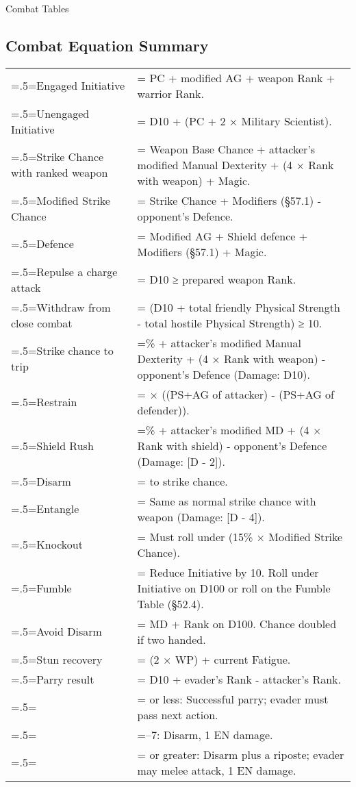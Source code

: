 \begin{Table}{Combat Tables}
\begin{multicols}{3}
\section{Combat Equation Summary}
\begin{tabularx}{\columnwidth}{>{\hsize=.5\hsize\linewidth=\hsize}X>{\hsize=1.5\hsize\linewidth=\hsize}X}
Engaged Initiative			& PC + modified AG + weapon Rank + warrior Rank. \\
Unengaged Initiative			& D10 + (PC + 2 × Military Scientist). \\
Strike Chance with ranked weapon	& Weapon Base Chance + attacker’s modified Manual Dexterity + (4 × Rank with weapon) + Magic. \\
Modified Strike Chance			& Strike Chance + Modifiers (§57.1) - opponent’s Defence. \\
Defence					& Modified AG + Shield defence + Modifiers (§57.1) + Magic. \\
Repulse a charge attack			& D10 ≥ prepared weapon Rank.\\
Withdraw from close combat		& (D10 + total friendly Physical Strength - total hostile Physical Strength) ≥ 10. \\
Strike chance to trip			& 40\% + attacker’s modified Manual Dexterity + (4 × Rank with weapon) - opponent’s Defence (Damage: D10). \\
Restrain				& 3 × ((PS+AG of attacker) - (PS+AG of defender)). \\
Shield Rush				& 40\% + attacker’s modified MD + (4 × Rank with shield) - opponent’s Defence (Damage: [D - 2]). \\
Disarm					& -20 to strike chance. \\
Entangle				& Same as normal strike chance with weapon (Damage: [D - 4]). \\
Knockout				& Must roll under (15\% × Modified Strike Chance). \\
Fumble					& Reduce Initiative by 10. Roll under Initiative on D100 or roll on the Fumble Table (§52.4). \\
Avoid Disarm				& MD + Rank on D100. Chance doubled if two handed.\\
Stun recovery				& (2 × WP) + current Fatigue. \\
Parry result				& D10 + evader’s Rank - attacker’s Rank. \\
					& 3 or less: Successful parry; evader must pass next action. \\
					& 4–7: Disarm, 1 EN damage. \\
					& 8 or greater: Disarm plus a riposte; evader may melee attack, 1 EN damage. \\
\end{tabularx}


\end{multicols}
\end{Table}

